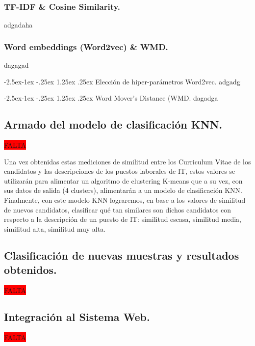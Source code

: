 \documentclass[12pt,a4paper]{article}
\makeatletter
\renewcommand\paragraph{\@startsection{paragraph}{4}{\z@}
            {-2.5ex\@plus -1ex \@minus -.25ex}
            {1.25ex \@plus .25ex}
            {\normalfont\normalsize\bfseries}}
\makeatother
\begin{document}
\begin{sloppypar}
\cleardoublepage

\subsubsection{TF-IDF \& Cosine Similarity.}
adgadaha

\subsubsection{Word embeddings (Word2vec) \& WMD.}\label{Implementacion_word_emb_y_wmd}
dagagad

\paragraph{Elección de hiper-parámetros Word2vec.}
adgadg

\paragraph{Word Mover's Distance (WMD.}
dagadga


\subsection{Armado del modelo de clasificación KNN.}\label{IMP_Modelo_clasificacion_KNN}
\colorbox{red}{FALTA}

Una vez obtenidas estas mediciones de similitud entre los Curriculum Vitae de los candidatos y las descripciones de los puestos laborales de IT, estos valores se utilizarán para alimentar un algoritmo de clustering K-means que a su vez, con sus datos de salida (4 clusters), alimentarán a un modelo de clasificación KNN. Finalmente, con este modelo KNN lograremos, en base a los valores de similitud de nuevos candidatos, clasificar qué tan similares son dichos candidatos con respecto a la descripción de un puesto de IT: similitud escasa, similitud media, similitud alta, similitud muy alta.

\cleardoublepage

\subsection{Clasificación de nuevas muestras y resultados obtenidos.}\label{5.4.Predicciondenuevasmuestrasyresultadosobtenidos}

\colorbox{red}{FALTA}

\cleardoublepage

\subsection{Integración al Sistema Web.}\label{5.5.IntegracionalSistemaWeb}
\colorbox{red}{FALTA}


\end{sloppypar}
\end{document}
